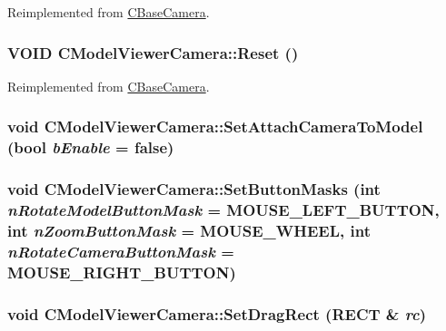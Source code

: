 Reimplemented from \hyperlink{class_c_base_camera_a77cc040ed2d0b3479412b81316beb793}{CBaseCamera}.\hypertarget{class_c_model_viewer_camera_a64f3b265b831578d24faadec70f9dc1b}{
\subsubsection[{Reset}]{\setlength{\rightskip}{0pt plus 5cm}VOID CModelViewerCamera::Reset ()}}
\label{class_c_model_viewer_camera_a64f3b265b831578d24faadec70f9dc1b}


Reimplemented from \hyperlink{class_c_base_camera_adc95e71e268d59a084f6e8d95a9aadb9}{CBaseCamera}.\hypertarget{class_c_model_viewer_camera_acb49faefb46c891fcbf9f96529d96c19}{
\subsubsection[{SetAttachCameraToModel}]{\setlength{\rightskip}{0pt plus 5cm}void CModelViewerCamera::SetAttachCameraToModel (bool {\em bEnable} = {\ttfamily false})}}
\label{class_c_model_viewer_camera_acb49faefb46c891fcbf9f96529d96c19}
\hypertarget{class_c_model_viewer_camera_a999c8bce2cb411f5b674a81f230dff96}{
\subsubsection[{SetButtonMasks}]{\setlength{\rightskip}{0pt plus 5cm}void CModelViewerCamera::SetButtonMasks ({\bf int} {\em nRotateModelButtonMask} = {\ttfamily MOUSE\_\-LEFT\_\-BUTTON}, \/  {\bf int} {\em nZoomButtonMask} = {\ttfamily MOUSE\_\-WHEEL}, \/  {\bf int} {\em nRotateCameraButtonMask} = {\ttfamily MOUSE\_\-RIGHT\_\-BUTTON})}}
\label{class_c_model_viewer_camera_a999c8bce2cb411f5b674a81f230dff96}
\hypertarget{class_c_model_viewer_camera_aecba47f0c48401639138f602d3ed28bd}{
\subsubsection[{SetDragRect}]{\setlength{\rightskip}{0pt plus 5cm}void CModelViewerCamera::SetDragRect (RECT \& {\em rc})}}
\label{class_c_model_viewer_camera_aecba47f0c48401639138f602d3ed28bd}


